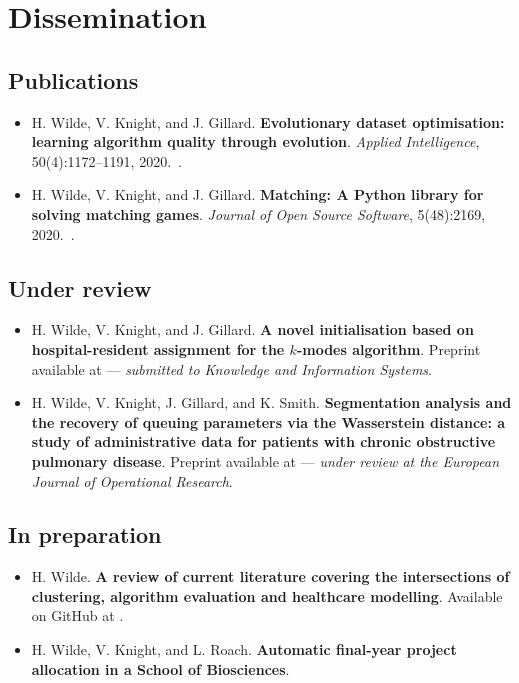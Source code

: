 \chapter*{Dissemination}

\section*{Publications}

\begin{itemize}
    \item H. Wilde, V. Knight, and J. Gillard. \textbf{Evolutionary dataset
        optimisation: learning algorithm quality through evolution}.
        \emph{Applied Intelligence}, 50(4):1172–1191,
        2020.~.
    \item H. Wilde, V. Knight, and J. Gillard. \textbf{Matching: A Python
        library for solving matching games}. \emph{Journal of Open Source
    Software}, 5(48):2169, 2020.~.
\end{itemize}

\section*{Under review}

\begin{itemize}
    \item H. Wilde, V. Knight, and J. Gillard. \textbf{A novel initialisation
        based on hospital-resident assignment for the \(k\)-modes algorithm}.
        Preprint available at  --- \emph{submitted to
        Knowledge and Information Systems}.
    \item H. Wilde, V. Knight, J. Gillard, and K. Smith. \textbf{Segmentation
        analysis and the recovery of queuing parameters via the Wasserstein
        distance: a study of administrative data for patients with chronic
        obstructive pulmonary disease}. Preprint available at 
        --- \emph{under review at the European Journal of Operational Research}.
\end{itemize}

\section*{In preparation}

\begin{itemize}
    \item H. Wilde. \textbf{A review of current literature covering the
        intersections of clustering, algorithm evaluation and healthcare
        modelling}. Available on GitHub at
        .
    \item H. Wilde, V. Knight, and L. Roach. \textbf{Automatic final-year
        project allocation in a School of Biosciences}.
\end{itemize}

